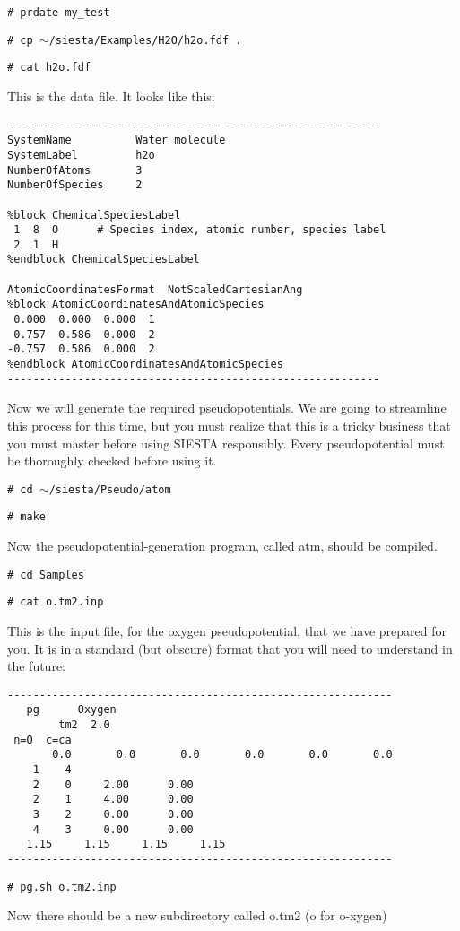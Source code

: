 {\tt \# prdate my\_test}

{\tt \# cp $\sim$/siesta/Examples/H2O/h2o.fdf .}

{\tt \# cat h2o.fdf}

This is the data file. 
It looks like this:
\begin{verbatim}
----------------------------------------------------------
SystemName          Water molecule
SystemLabel         h2o
NumberOfAtoms       3
NumberOfSpecies     2

%block ChemicalSpeciesLabel
 1  8  O      # Species index, atomic number, species label
 2  1  H
%endblock ChemicalSpeciesLabel

AtomicCoordinatesFormat  NotScaledCartesianAng
%block AtomicCoordinatesAndAtomicSpecies
 0.000  0.000  0.000  1
 0.757  0.586  0.000  2
-0.757  0.586  0.000  2
%endblock AtomicCoordinatesAndAtomicSpecies
----------------------------------------------------------
\end{verbatim}

Now we will generate the required pseudopotentials.
We are going to streamline this process for this time, but
you must realize that this is a tricky business that you 
must master before using SIESTA responsibly. Every 
pseudopotential must be thoroughly checked before using it.

{\tt \# cd $\sim$/siesta/Pseudo/atom}

{\tt \# make}

Now the pseudopotential-generation program, called atm, 
should be compiled.

{\tt \# cd Samples}

{\tt \# cat o.tm2.inp}

This is the input file, for the oxygen pseudopotential, 
that we have prepared for you. 
It is in a standard (but obscure) format that
you will need to understand in the future:
\begin{verbatim}
------------------------------------------------------------
   pg      Oxygen
        tm2  2.0
 n=O  c=ca 
       0.0       0.0       0.0       0.0       0.0       0.0
    1    4
    2    0     2.00      0.00
    2    1     4.00      0.00
    3    2     0.00      0.00
    4    3     0.00      0.00
   1.15     1.15     1.15     1.15
------------------------------------------------------------
\end{verbatim}

{\tt \# pg.sh o.tm2.inp}

Now there should be a new subdirectory called o.tm2 (o for o-xygen)

